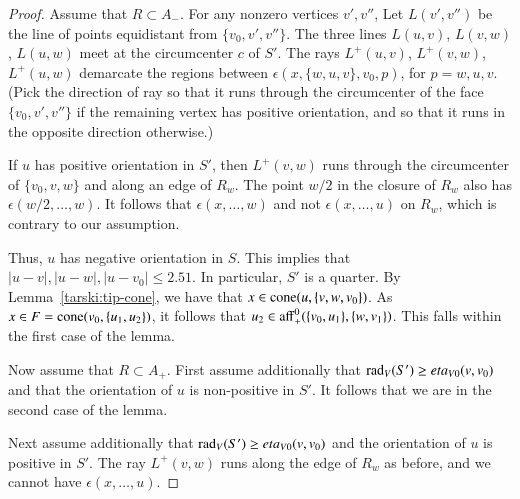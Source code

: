 \begin{tarskidata}
\begin{tarski}
\begin{proof}
Assume that $R\subset A_-$.
For any nonzero vertices $v',v''$,
Let $L(v',v'')$ be the line of points equidistant from $\{v_0,v',v''\}$.
The three lines $L(u,v)$, $L(v,w)$, $L(u,w)$ meet at the circumcenter
$c$ of $S'$.  The rays $L^+(u,v)$, $L^+(v,w)$, $L^+(u,w)$ demarcate
the regions between $\epsilon(x,\{w,u,v\},v_0,p)$, for $p=w,u,v$.  
(Pick the direction
of ray so that it runs through the circumcenter of the face $\{v_0,v',v''\}$
if the remaining vertex has positive orientation, and so that it
runs in the opposite direction otherwise.)

If $u$ has positive orientation in $S'$, then $L^+(v,w)$ runs through
the circumcenter of $\{v_0,v,w\}$ and along an edge of $R_w$.
The point $w/2$ in the closure of  $R_w$ also has 
$\epsilon(w/2,\ldots,w)$.
It follows that $\epsilon(x,\ldots,w)$ and not $\epsilon(x,\ldots,u)$
on $R_w$, which is contrary
to our assumption.

Thus, $u$ has negative orientation in $S$.  
This implies that $|u-v|,|u-w|,|u-v_0|\le 2.51$.  In particular,
$S'$ is a quarter.  By Lemma~\ref{tarski:tip-cone}, we have
that $x\in {\operatorname{cone}}(u,\{v,w,v_0\})$.  As $x\in F = {\operatorname{cone}}(v_0,\{u_1,u_2\})$, it follows that $u_2\in {\operatorname{aff}}_+^0(\{v_0,u_1\},\{w,v_1\})$.
This falls within the first case of the lemma.


Now assume that $R\subset A_+$.
First assume additionally that
$\operatorname{rad}_V(S')\ge eta_{V0}(v,v_0)$ and that
the orientation of $u$ is non-positive in $S'$.  It
follows that we are in the second case of the lemma.  

Next assume additionally that
$\operatorname{rad}_V(S')\ge eta_{V0}(v,v_0)$ and the orientation of $u$ is positive
in $S'$.  The ray $L^+(v,w)$ runs along the edge of 
$R_w$ as before, and we cannot have $\epsilon(x,\ldots,u)$.


\end{proof}
\end{tarski}
\end{tarskidata}
